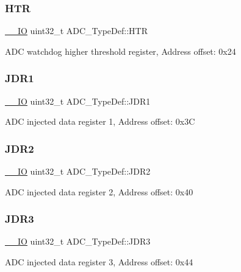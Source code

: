 \subsubsection{\texorpdfstring{HTR}{HTR}}
{\footnotesize\ttfamily \mbox{\hyperlink{core__sc300_8h_aec43007d9998a0a0e01faede4133d6be}{\+\_\+\+\_\+\+IO}} uint32\+\_\+t A\+D\+C\+\_\+\+Type\+Def\+::\+H\+TR}

A\+DC watchdog higher threshold register, Address offset\+: 0x24 \mbox{\label{struct_a_d_c___type_def_ab4b0a79a9e4a9d5b0a24d7285cf55bdc}} 
\subsubsection{\texorpdfstring{JDR1}{JDR1}}
{\footnotesize\ttfamily \mbox{\hyperlink{core__sc300_8h_aec43007d9998a0a0e01faede4133d6be}{\+\_\+\+\_\+\+IO}} uint32\+\_\+t A\+D\+C\+\_\+\+Type\+Def\+::\+J\+D\+R1}

A\+DC injected data register 1, Address offset\+: 0x3C \mbox{\label{struct_a_d_c___type_def_a898b87cab4f099bcca981cc4c9318b51}} 
\subsubsection{\texorpdfstring{JDR2}{JDR2}}
{\footnotesize\ttfamily \mbox{\hyperlink{core__sc300_8h_aec43007d9998a0a0e01faede4133d6be}{\+\_\+\+\_\+\+IO}} uint32\+\_\+t A\+D\+C\+\_\+\+Type\+Def\+::\+J\+D\+R2}

A\+DC injected data register 2, Address offset\+: 0x40 \mbox{\label{struct_a_d_c___type_def_a40999cd0a255ef62b2340e2726695063}} 
\subsubsection{\texorpdfstring{JDR3}{JDR3}}
{\footnotesize\ttfamily \mbox{\hyperlink{core__sc300_8h_aec43007d9998a0a0e01faede4133d6be}{\+\_\+\+\_\+\+IO}} uint32\+\_\+t A\+D\+C\+\_\+\+Type\+Def\+::\+J\+D\+R3}

A\+DC injected data register 3, Address offset\+: 0x44 \mbox{\label{struct_a_d_c___type_def_abae6e9d688b16ef350878998f5e21c0b}} 
